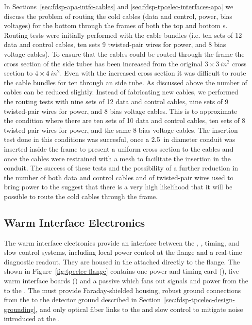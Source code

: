 In Sections~\ref{sec:fdsp-apa-intfc-cables} and \ref{sec:fdsp-tpcelec-interfaces-apa}
we discuss the problem of routing the cold cables (data and control, power,
bias voltages) for the bottom  through the frames of both
the top and bottom s. Routing tests were initially performed
with the  cable bundles (i.e. ten sets of 12 data and
control cables, ten sets 9 twisted-pair wires for power, and 8 bias voltage
cables). To ensure that the cables could be routed through the
 frame the cross section of the side tubes has been
increased from the original $\num{3}\times\SI{3}{in^2}$ cross
section to $\num{4}\times\SI{4}{in^2}$. Even with the increased
cross section it was difficult to route the cable bundles for
ten  through an  side tube. As discussed
above the number of cables can be reduced slightly. Instead of
fabricating new cables, we performed the routing tests with
nine sets of 12 data and control cables, nine sets of 9
twisted-pair wires for power, and 8 bias voltage cables.
This is to approximate the condition where there are ten sets
of 10 data and control cables, ten sets of 8 twisted-pair
wires for power, and the same 8 bias voltage cables. The
insertion test done in this conditions was succesful, once
a \SI{2.5}{in} diameter conduit was inserted inside the 
 frame to present a uniform cross section to
the cables and once the cables were restrained with a mesh
to facilitate the insertion in the conduit. The success of
these tests and the possibility of a further reduction in the
number of both data and control cables and of twisted-pair
wires used to bring power to the  suggest
that there is a very high likelihood that it will be possible
to route the cold cables through the  frame.

\subsection{Warm Interface Electronics}
\label{sec:fdsp-tpcelec-design-warm}

The warm interface electronics provide an interface between the 
, , timing, and slow control systems, including 
local power control at the flange and a real-time diagnostic readout. 
They are housed in the  attached directly to the  
flange.  The  shown in Figure~\ref{fig:tpcelec-flange} 
contains one power and timing card (), five warm interface 
boards () and a passive 
which fans out signals and  power from the  to the 
. The  must provide Faraday-shielded housing, 
robust ground connections from the  to the detector ground 
described in Section~\ref{sec:fdsp-tpcelec-design-grounding}, and only 
optical fiber links to the  and slow control to mitigate 
noise introduced at the  \fdth.

